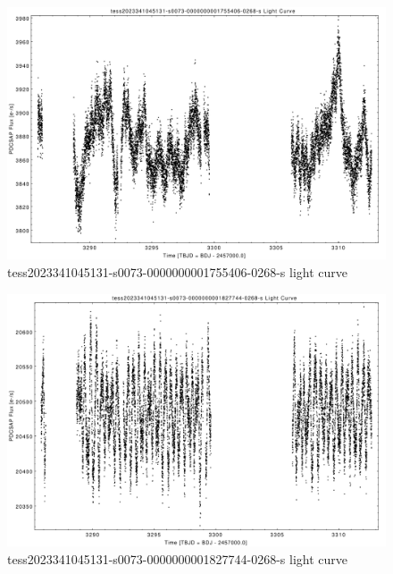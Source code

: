 \documentclass[a4paper,12pt]{article}
\begin{document}
\begin{figure}[htbp]
    \centering
    \includegraphics[width = 1\textwidth]{
      ../lightcurves/tess2023341045131-s0073-0000000001755406-0268-s.pdf}
    \caption{tess2023341045131-s0073-0000000001755406-0268-s light curve}
\end{figure}
\begin{figure}[htbp]
    \centering
    \includegraphics[width = 1\textwidth]{
      ../lightcurves/tess2023341045131-s0073-0000000001827744-0268-s.pdf}
    \caption{tess2023341045131-s0073-0000000001827744-0268-s light curve}
\end{figure}
\end{document}
